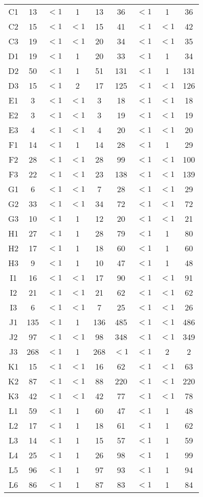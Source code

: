 \begin{center}
\begin{longtable}{ccccc|cccc}
C1&13&$<1$&1&13&36&$<1$&1&36\\
C2&15&$<1$&$<1$&15&41&$<1$&$<1$&42\\
C3&19&$<1$&$<1$&20&34&$<1$&$<1$&35\\
D1&19&$<1$&1&20&33&$<1$&1&34\\
D2&50&$<1$&1&51&131&$<1$&1&131\\
D3&15&$<1$&2&17&125&$<1$&$<1$&126\\
E1&3&$<1$&$<1$&3&18&$<1$&$<1$&18\\
E2&3&$<1$&$<1$&3&19&$<1$&$<1$&19\\
E3&4&$<1$&$<1$&4&20&$<1$&$<1$&20\\
F1&14&$<1$&1&14&28&$<1$&1&29\\
F2&28&$<1$&$<1$&28&99&$<1$&$<1$&100\\
F3&22&$<1$&$<1$&23&138&$<1$&$<1$&139\\
G1&6&$<1$&$<1$&7&28&$<1$&$<1$&29\\
G2&33&$<1$&$<1$&34&72&$<1$&$<1$&72\\
G3&10&$<1$&1&12&20&$<1$&$<1$&21\\
H1&27&$<1$&1&28&79&$<1$&1&80\\
H2&17&$<1$&1&18&60&$<1$&1&60\\
H3&9&$<1$&1&10&47&$<1$&1&48\\
I1&16&$<1$&$<1$&17&90&$<1$&$<1$&91\\
I2&21&$<1$&$<1$&21&62&$<1$&$<1$&62\\
I3&6&$<1$&$<1$&7&25&$<1$&$<1$&26\\
J1&135&$<1$&1&136&485&$<1$&$<1$&486\\
J2&97&$<1$&$<1$&98&348&$<1$&$<1$&349\\
J3&268&$<1$&1&268&$<1$&$<1$&2&2\\
K1&15&$<1$&$<1$&16&62&$<1$&$<1$&63\\
K2&87&$<1$&$<1$&88&220&$<1$&$<1$&220\\
K3&42&$<1$&$<1$&42&77&$<1$&$<1$&78\\
L1&59&$<1$&1&60&47&$<1$&1&48\\
L2&17&$<1$&1&18&61&$<1$&1&62\\
L3&14&$<1$&1&15&57&$<1$&1&59\\
L4&25&$<1$&1&26&98&$<1$&1&99\\
L5&96&$<1$&1&97&93&$<1$&1&94\\
L6&86&$<1$&1&87&83&$<1$&1&84\\
\end{longtable}
\end{center}

